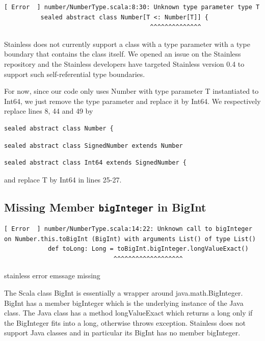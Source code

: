 \documentclass[runningheads]{llncs}
\newcommand{\todo}[1]{{\par \color{red}#1}}
\begin{document}
\begin{lstlisting}[style=stainless]
[ Error  ] number/NumberType.scala:8:30: Unknown type parameter type T
          sealed abstract class Number[T <: Number[T]] {
                                        ^^^^^^^^^^^^^^
\end{lstlisting}

Stainless does not currently support a class with a type parameter
with a type boundary that contains the class itself. We opened an
issue \cite{Stainless:issue519} on the Stainless repository and the
Stainless developers have targeted Stainless version 0.4 to support
such self-referential type boundaries.

For now, since our code only uses Number with type parameter T
instantiated to Int64, we just remove the type parameter and replace
it by Int64. We respectively replace lines 8, 44 and 49 by
\begin{lstlisting}[style=scala]
sealed abstract class Number {
\end{lstlisting}

\begin{lstlisting}[style=scala]
sealed abstract class SignedNumber extends Number
\end{lstlisting}

\begin{lstlisting}[style=scala]
sealed abstract class Int64 extends SignedNumber {
\end{lstlisting}

and replace T by Int64 in lines 25-27.


\subsection{Missing Member \texttt{bigInteger} in BigInt}


\begin{lstlisting}[style=stainless]
[ Error  ] number/NumberType.scala:14:22: Unknown call to bigInteger on Number.this.toBigInt (BigInt) with arguments List() of type List()
            def toLong: Long = toBigInt.bigInteger.longValueExact()
                              ^^^^^^^^^^^^^^^^^^^
\end{lstlisting}
\todo{stainless error emssage missing}

The Scala class BigInt is essentially a wrapper around
java.math.BigInteger. BigInt has a member bigInteger which is the
underlying instance of the Java class. The Java class has a method
longValueExact which returns a long only if the BigInteger fits into a
long, otherwise throws exception. Stainless does not support Java
classes and in particular its BigInt has no member bigInteger.
\end{document}
